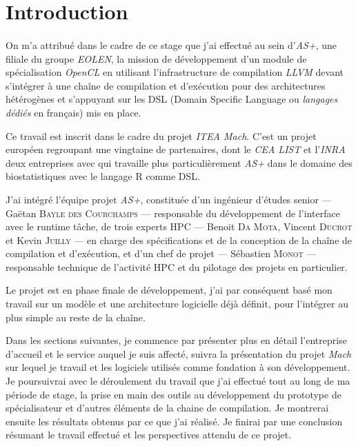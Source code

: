 \section{Introduction}
\paragraph{}
On m'a attribué dans le cadre de ce stage que j'ai effectué au sein
d'\emph{AS+}, une filiale du groupe \emph{EOLEN}, la mission de développement
d'un module de spécialisation \emph{OpenCL} en utilisant l'infrastructure de
compilation \emph{LLVM} devant s'intégrer à une chaîne de compilation et
d’exécution pour des architectures hétérogènes et s’appuyant sur les DSL (Domain
Specific Language ou \emph{langages dédiés} en français) mis en place.

Ce travail est inscrit dans le cadre du projet \emph{ITEA Mach}. C'est un projet
européen regroupant une vingtaine de partenaires, dont le \emph{CEA LIST} et
l'\emph{INRA} deux entreprises avec qui travaille plus particulièrement
\emph{AS+} dans le domaine des biostatistiques avec le langage R comme DSL.

J’ai intégré l’équipe projet \emph{AS+}, constituée d’un ingénieur d’études
senior — Gaëtan \textsc{Bayle des Courchamps} — responsable du développement de
l’interface avec le runtime tâche, de trois experts HPC — Benoit \textsc{Da Mota},
Vincent \textsc{Ducrot} et Kevin \textsc{Juilly} — en charge des spécifications et de
la conception de la chaîne de compilation et d’exécution, et d’un chef de projet
— Sébastien \textsc{Monot} — responsable technique de l’activité HPC et du
pilotage des projets en particulier.

Le projet est en phase finale de développement, j'ai par conséquent basé mon
travail sur un modèle et une architecture logicielle déjà définit, pour
l'intégrer au plus simple au reste de la chaîne.

Dans les sections suivantes, je commence par présenter plus en détail
l'entreprise d'accueil et le service auquel je suis affecté, suivra la
présentation du projet \emph{Mach} sur lequel je travail et les logiciels
utilisés comme fondation à son développement. Je poursuivrai avec le déroulement du
travail que j'ai effectué tout au long de ma période de stage, la prise en main
des outils au développement du prototype de spécialisateur et d’autres éléments
de la chaine de compilation. Je montrerai ensuite les résultats obtenus par ce
que j’ai réalisé. Je finirai par une conclusion résumant le travail effectué et
les perspectives attendu de ce projet.
